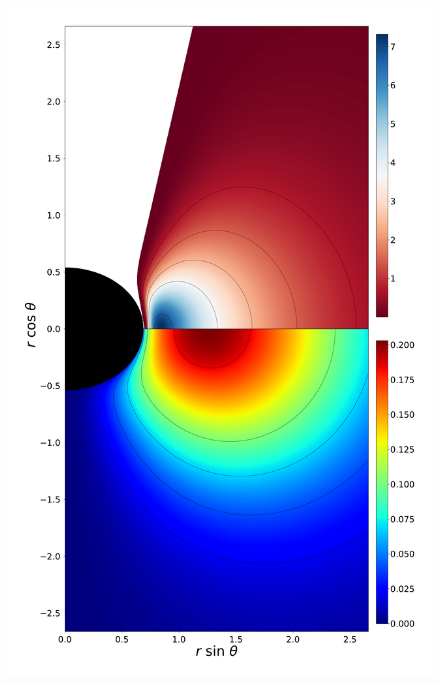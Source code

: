 \documentclass[twocolumn,aps,showpacs,showkeys,prd,superscriptaddress,byrevtex, amsmath]{revtex4-1}
\begin{document}
\begin{figure}
\includegraphics[scale=0.12]{figures/fig6_IV_10.pdf}
\hspace{-0.4cm}

\end{figure}
\end{document}
